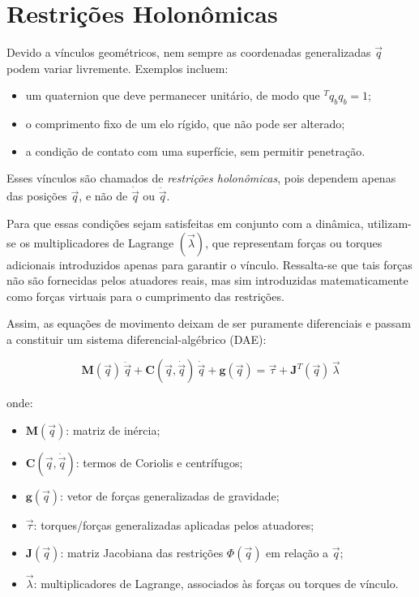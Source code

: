 \section{Restrições Holonômicas}

Devido a vínculos geométricos, nem sempre as coordenadas generalizadas $\vec q$ podem variar livremente. 
Exemplos incluem:
\begin{itemize}
    \item um quaternion que deve permanecer unitário, de modo que ${}^T q_b q_b = 1$;
    \item o comprimento fixo de um elo rígido, que não pode ser alterado;
    \item a condição de contato com uma superfície, sem permitir penetração.
\end{itemize}

Esses vínculos são chamados de \emph{restrições holonômicas}, pois dependem apenas das posições $\vec q$, e não de $\dot{\vec q}$ ou $\ddot{\vec q}$.

Para que essas condições sejam satisfeitas em conjunto com a dinâmica, utilizam-se os multiplicadores de Lagrange $(\vec \lambda)$, que representam forças ou torques adicionais introduzidos apenas para garantir o vínculo. Ressalta-se que tais forças não são fornecidas pelos atuadores reais, mas sim introduzidas matematicamente como forças virtuais para o cumprimento das restrições.

Assim, as equações de movimento deixam de ser puramente diferenciais e passam a constituir um sistema diferencial-algébrico (DAE):

\begin{equation}
\mathbf{M}(\vec{q})\,\ddot{\vec{q}} +
\mathbf{C}(\vec{q},\dot{\vec{q}})\,\dot{\vec{q}} +
\mathbf{g}(\vec{q}) =
\vec{\tau} +
\mathbf{J}^T(\vec{q}) \,\vec{\lambda}
\end{equation}

onde:
\begin{itemize}
    \item $\mathbf{M}(\vec{q})$: matriz de inércia;
    \item $\mathbf{C}(\vec{q},\dot{\vec{q}})$: termos de Coriolis e centrífugos;
    \item $\mathbf{g}(\vec{q})$: vetor de forças generalizadas de gravidade;
    \item $\vec{\tau}$: torques/forças generalizadas aplicadas pelos atuadores;
    \item $\mathbf{J}(\vec{q})$: matriz Jacobiana das restrições $\Phi(\vec q)$ em relação a $\vec q$;
    \item $\vec{\lambda}$: multiplicadores de Lagrange, associados às forças ou torques de vínculo.
\end{itemize}

